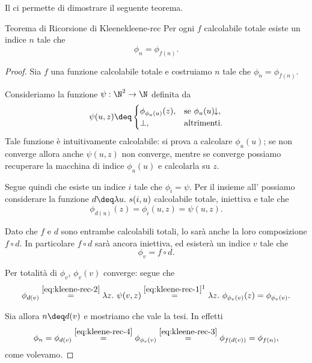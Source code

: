 Il  ci permette di dimostrare il seguente teorema.

\begin{theorem}
    {Teorema di Ricorsione di Kleene}{kleene-rec}
    Per ogni $f$ calcolabile totale esiste un indice $n$ tale che \[
        \phi_n = \phi_{f(n)}.
    \]
\end{theorem}
\begin{proof}
    Sia $f$ una funzione calcolabile totale e costruiamo $n$ tale che $\phi_n = \phi_{f(n)}$.

    Consideriamo la funzione $\psi : \N^2 \to \N$ definita da \begin{equation}\label{eq:kleene-rec-1}
        \psi(u, z) \deq \begin{cases}
            \phi_{\phi_u(u)}(z), &\text{se } \phi_{u}(u)\conv,\\
            \bot, &\text{altrimenti.}
        \end{cases}
    \end{equation} Tale funzione è intuitivamente calcolabile: si prova a calcolare $\phi_u(u)$; se non converge allora anche $\psi(u, z)$ non converge, mentre se converge possiamo recuperare la macchina di indice $\phi_u(u)$ e calcolarla su $z$.
    
    Segue quindi che esiste un indice $i$ tale che $\phi_i = \psi$. Per il  insieme all' possiamo considerare la funzione $d \deq \lam{u}{s(i, u)}$ calcolabile totale, iniettiva e tale che \begin{equation}\label{eq:kleene-rec-2}
        \phi_{d(u)}(z) = \phi_i(u, z) = \psi(u, z).
    \end{equation}

    Dato che $f$ e $d$ sono entrambe calcolabili totali, lo sarà anche la loro composizione $f \circ d$. In particolare $f \circ d$ sarà ancora iniettiva, ed esisterà un indice $v$ tale che \begin{equation}\label{eq:kleene-rec-3}
        \phi_v = f \circ d.
    \end{equation}

    Per totalità di $\phi_v$, $\phi_v(v)$ converge: segue che \begin{equation}\label{eq:kleene-rec-4}
        \phi_{d(v)} 
            \stackrel{\eqref{eq:kleene-rec-2}}{=} \lam{z}{\psi(v,z)} 
            \stackrel{\eqref{eq:kleene-rec-1}\footnotemark}{=} \lam{z}{\phi_{\phi_v(v)}(z)}
            = \phi_{\phi_v(v)}.
    \end{equation}
    
    Sia allora $n \deq d(v)$ e mostriamo che vale la tesi. In effetti \[
        \phi_n 
            = \phi_{d(v)} 
            \stackrel{\eqref{eq:kleene-rec-4}}{=} \phi_{\phi_v(v)}
            \stackrel{\eqref{eq:kleene-rec-3}}{=} \phi_{f(d(v))}
            = \phi_{f(n)},
    \] come volevamo.
\end{proof}